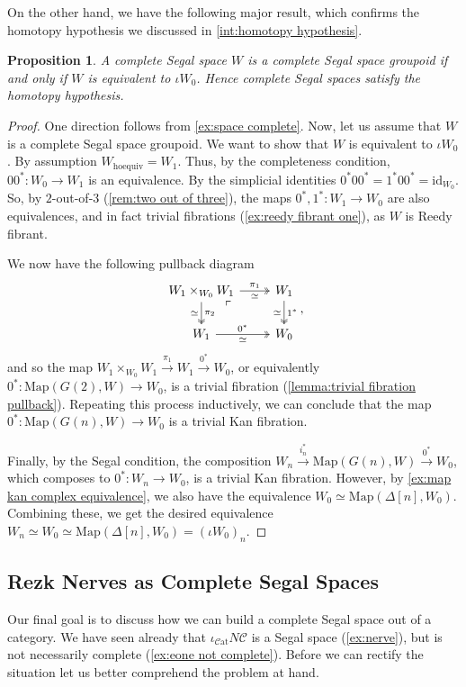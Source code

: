 \documentclass[11pt, a4paper]{amsart}
\newcommand{\cC}{\mathcal{C}}
\newcommand{\Map}{\mathrm{Map}}
\newcommand{\Cat}{\mathscr{C}\mathrm{at}}
\newcommand{\id}{\mathrm{id}}
\newcommand{\inccat}{\iota_{\Cat}}
\newcommand{\hoequiv}{\mathrm{hoequiv}}
\newtheorem{proposition}[equation]{Proposition}
\theoremstyle{definition}
\theoremstyle{remark}
\numberwithin{equation}{section}
\begin{document}
On the other hand, we have the following major result, which confirms the homotopy hypothesis we discussed in \cref{int:homotopy hypothesis}.
 
 \begin{proposition}
  A complete Segal space $W$ is a complete Segal space groupoid if and only if $W$ is equivalent to $\iota W_0$. Hence complete Segal spaces satisfy the homotopy hypothesis.
 \end{proposition}

 \begin{proof}
  One direction follows from \cref{ex:space complete}. Now, let us assume that $W$ is a complete Segal space groupoid. We want to show that $W$ is equivalent to $\iota W_0$. By assumption $W_{\hoequiv} = W_1$. Thus, by the completeness condition, $00^*\colon W_0 \to W_1$ is an equivalence. By the simplicial identities $0^*00^* = 1^*00^* = \id_{W_0}$. So, by $2$-out-of-$3$ (\cref{rem:two out of three}), the maps $0^*,1^*\colon W_1 \to W_0$ are also equivalences, and in fact trivial fibrations (\cref{ex:reedy fibrant one}), as $W$ is Reedy fibrant.

  We now have the following pullback diagram
  \[
  \begin{tikzcd}
   W_1 \times_{W_0} W_1 \arrow[r, "\pi_1", twoheadrightarrow, "\simeq"'] \arrow[d, "\pi_2", twoheadrightarrow, "\simeq"'] \arrow[dr, phantom, "\ulcorner", very near start] & W_1 \arrow[d, "1^*", twoheadrightarrow, "\simeq"'] \\
   W_1 \arrow[r, twoheadrightarrow, "0^*", "\simeq"'] & W_0
  \end{tikzcd},
  \]
  and so the map $W_1 \times_{W_0} W_1 \xrightarrow{\pi_1} W_1 \xrightarrow{0^*}W_0$, or equivalently $0^*\colon \Map(G(2),W) \to W_0$, is a trivial fibration (\cref{lemma:trivial fibration pullback}). Repeating this process inductively, we can conclude that the map $0^*\colon\Map(G(n),W) \to W_0$ is a trivial Kan fibration.

  Finally, by the Segal condition, the composition $W_n \xrightarrow{ i_n^*} \Map(G(n),W) \xrightarrow{0^*} W_0$, which composes to $0^*\colon W_n \to W_0$, is a trivial Kan fibration. However, by \cref{ex:map kan complex equivalence}, we also have the equivalence $W_0 \simeq \Map(\Delta[n],W_0)$. Combining these, we get the desired equivalence $W_n \simeq W_0 \simeq \Map(\Delta[n],W_0) = (\iota W_0)_n$.
 \end{proof}

 \subsection{Rezk Nerves as Complete Segal Spaces} \label{subsec:nerves as css}
 Our final goal is to discuss how we can build a complete Segal space out of a category. We have seen already that $\inccat N \cC$ is a Segal space (\cref{ex:nerve}), but is not necessarily complete (\cref{ex:eone not complete}). Before we can rectify the situation let us better comprehend the problem at hand. 
 
\end{document}

